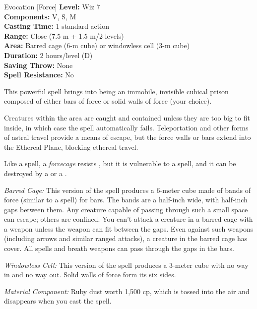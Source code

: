 {Evocation [Force]}
{
	\textbf{Level:}
	Wiz 7\\
	\textbf{Components:}
	V, S, M\\
	\textbf{Casting Time:}
	1 standard action\\
	\textbf{Range:}
	Close (7.5 m + 1.5 m/2 levels)\\
	\textbf{Area:}
	Barred cage (6-m cube) or windowless cell (3-m cube)\\
	\textbf{Duration:}
	2 hours/level (D)\\
	\textbf{Saving Throw:}
	None\\
	\textbf{Spell Resistance:}
	No\\
}
{
	This powerful spell brings into being an immobile, invisible cubical prison composed of either bars of force or solid walls of force (your choice).

	Creatures within the area are caught and contained unless they are too big to fit inside, in which case the spell automatically fails. Teleportation and other forms of astral travel provide a means of escape, but the force walls or bars extend into the Ethereal Plane, blocking ethereal travel.

	Like a  spell, a \emph{forcecage} resists , but it is vulnerable to a  spell, and it can be destroyed by a  or a .

	\textit{Barred Cage:}
	This version of the spell produces a 6-meter cube made of bands of force (similar to a  spell) for bars. The bands are a half-inch wide, with half-inch gaps between them. Any creature capable of passing through such a small space can escape; others are confined. You can't attack a creature in a barred cage with a weapon unless the weapon can fit between the gaps. Even against such weapons (including arrows and similar ranged attacks), a creature in the barred cage has cover. All spells and breath weapons can pass through the gaps in the bars.

	\textit{Windowless Cell:}
	This version of the spell produces a 3-meter cube with no way in and no way out. Solid walls of force form its six sides.

	\textit{Material Component:}
	Ruby dust worth 1,500 cp, which is tossed into the air and disappears when you cast the spell.

}
